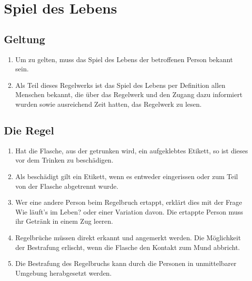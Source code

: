 \chapter{Spiel des Lebens}
\section{Geltung}
\begin{enumerate}[label={(\arabic*)}]
    \item
    Um zu gelten, muss das Spiel des Lebens der betroffenen Person bekannt sein.

    \item
    Als Teil dieses Regelwerks ist das Spiel des Lebens per Definition allen Menschen bekannt, die über das Regelwerk und den Zugang dazu informiert wurden sowie ausreichend Zeit hatten, das Regelwerk zu lesen. 
\end{enumerate}

\section{Die Regel}
\begin{enumerate}[label={(\arabic*)}]
    \item
    Hat die Flasche, aus der getrunken wird, ein aufgeklebtes Etikett, so ist dieses vor dem Trinken zu beschädigen.

    \item
    Als beschädigt gilt ein Etikett, wenn es entweder eingerissen oder zum Teil von der Flasche abgetrennt wurde.

    \item
    Wer eine andere Person beim Regelbruch ertappt, erklärt dies mit der Frage \glqq{}Wie läuft's im Leben?\grqq{} oder einer Variation davon.
    Die ertappte Person muss ihr Getränk in einem Zug leeren.

    \item
    Regelbrüche müssen direkt erkannt und angemerkt werden.
    Die Möglichkeit der Bestrafung erlischt, wenn die Flasche den Kontakt zum Mund abbricht.

    \item
    Die Bestrafung des Regelbruchs kann durch die Personen in unmittelbarer Umgebung herabgesetzt werden.
\end{enumerate}
